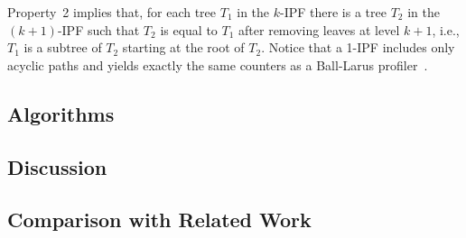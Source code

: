 Property~2 implies that, for each tree $T_1$ in the $k$-IPF there is a tree $T_2$ in the $(k+1)$-IPF such that $T_2$ is equal to $T_1$ after removing leaves at level $k+1$, i.e., $T_1$ is a subtree of $T_2$ starting at the root of $T_2$. Notice that a 1-IPF includes only acyclic paths and yields exactly the same counters as a Ball-Larus profiler~\cite{Ball96}.


\subsection{Algorithms}

\subsection{Discussion}


\subsection{Comparison with Related Work}